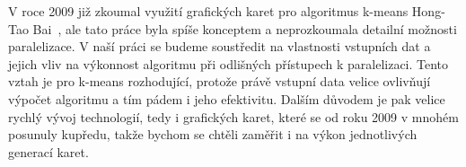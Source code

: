 

V roce 2009 již zkoumal využití grafických karet pro algoritmus k-means Hong-Tao Bai~\cite{Hong09}, ale tato práce byla spíše konceptem a neprozkoumala detailní možnosti paralelizace.
V naší práci se budeme soustředit na vlastnosti vstupních dat a jejich vliv na výkonnost algoritmu při odlišných přístupech k paralelizaci. Tento vztah je pro k-means rozhodující, protože právě vstupní data velice ovlivňují výpočet algoritmu a tím pádem i jeho efektivitu.
Dalším důvodem je pak velice rychlý vývoj technologií, tedy i grafických karet, které se od roku 2009 v mnohém posunuly kupředu, takže bychom se chtěli zaměřit i na výkon jednotlivých generací karet.\\




